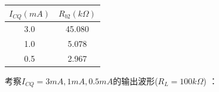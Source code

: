 \documentclass[12pt, a4paper]{article}
\begin{document}
         \begin{center}
        	\begin{tabular}{| c | c | }
        		\hline
        		$I_{CQ}(mA)$& $R_{b2}(k\Omega)$   \\
        		\hline
        		3.0 & 45.080  \\
        		\hline
        		1.0 & 5.078  \\
        		\hline
        		0.5 & 2.967 \\
        		\hline
        	\end{tabular}
        \end{center} \par
        考察$I_{CQ} = 3mA, 1mA, 0.5mA$的输出波形($R_L = 100k\Omega$) ：
    \begin{figure}[H]
    	\centering
    	

\end{figure}
\end{document}
